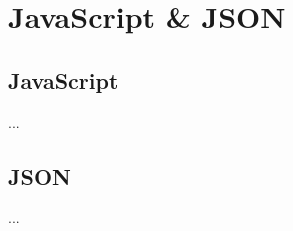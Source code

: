 \section{JavaScript \& JSON}
\label{sec:javascript-json}

\subsection{JavaScript}

...

\subsection{JSON}

...
